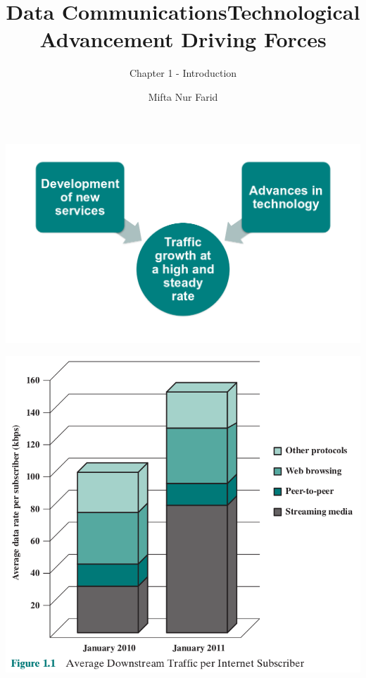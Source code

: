 \documentclass[pdflatex,compress]{beamer}
\title{Data Communications}
\subtitle{Chapter 1 - Introduction}
\author{Mifta Nur Farid}
\begin{document}
\maketitle

\begin{frame}
	\title{Technological Advancement Driving Forces}
	\begin{center}
		\includegraphics[width=\linewidth]{img/img01}
	\end{center}
\end{frame}

\begin{frame}
	\begin{center}
		\includegraphics[height=0.8\textheight]{img/img02}
	\end{center}
\end{frame}
\end{document}
